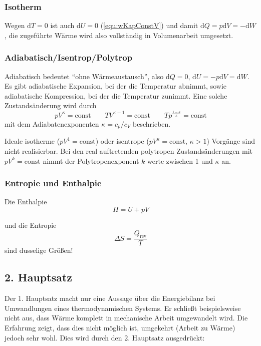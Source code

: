 \documentclass[a4paper]{scrartcl}
\begin{document}
\subsubsection{Isotherm}
Wegen $\text{d}T=0$ ist auch $\text{d}U=0$ (\ref{equ:wKapConstV}) und damit $\text{d}Q = p\text{d}V = -\text{d}W$, die zugeführte Wärme wird also vollständig in Volumenarbeit umgesetzt.

\subsubsection{Adiabatisch/Isentrop/Polytrop}
Adiabatisch bedeutet "`ohne Wärmeaustausch"', also $\text{d}Q = 0$, $\text{d}U = -p\text{d}V = \text{d}W$. Es gibt adiabatische Expansion, bei der die Temperatur abnimmt, sowie adiabatische Kompression, bei der die Temperatur zunimmt. Eine solche Zustandsänderung wird durch
\begin{equation}
  pV^\kappa = \text{const} \qquad TV^{\kappa-1} = \text{const} \qquad Tp^{\frac{1-\kappa}{\kappa}} = \text{const}
  \label{equ:Adiabatisch}
\end{equation}
mit dem Adiabatenexponenten $\kappa = c_p/c_V$ beschrieben.

Ideale isotherme ($pV^1 = \text{const}$) oder isentrope ($pV^\kappa=\text{const}$, $\kappa > 1$) Vorgänge sind nicht realisierbar. Bei den real auftretenden polytropen Zustandsänderungen mit $pV^k =\text{const}$ nimmt der Polytropenexponent $k$ werte zwischen 1 und $\kappa$ an.

\subsubsection{Entropie und Enthalpie}
Die Enthalpie
\begin{equation*}
  H = U + pV
\end{equation*}

und die Entropie
\begin{equation*}
  \Delta S = \frac{Q_\text{rev}}{T}
\end{equation*}
sind dusselige Größen!

\subsection{2. Hauptsatz}
Der 1. Hauptsatz macht nur eine Aussage über die Energiebilanz bei Umwandlungen eines thermodynamischen Systems. Er schließt beispielsweise nicht aus, dass Wärme komplett in mechanische Arbeit umgewandelt wird. Die Erfahrung zeigt, dass dies nicht möglich ist, umgekehrt (Arbeit zu Wärme) jedoch sehr wohl. Dies wird durch den 2. Hauptsatz ausgedrückt:
\end{document}
